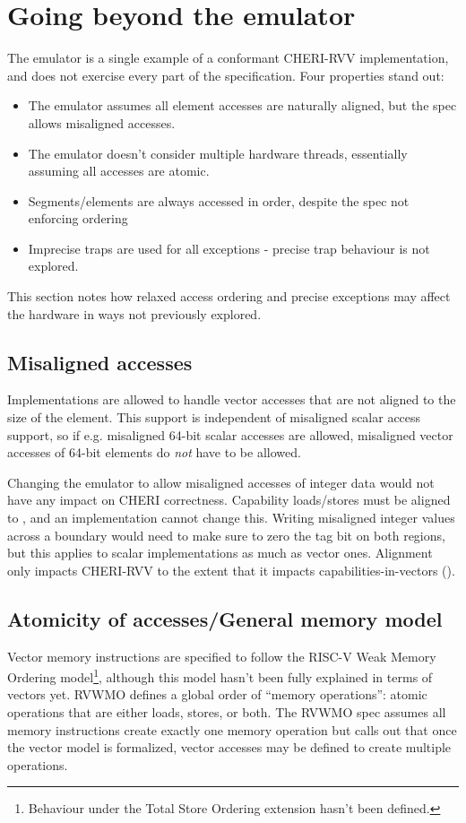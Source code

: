 \section{Going beyond the emulator}
The emulator is a single example of a conformant CHERI-RVV implementation, and does not exercise every part of the specification.
Four properties stand out:
\begin{itemize}
    \item The emulator assumes all element accesses are naturally aligned, but the spec allows misaligned accesses.
    \item The emulator doesn't consider multiple hardware threads, essentially assuming all accesses are atomic.
    \item Segments/elements are always accessed in order, despite the spec not enforcing ordering
    \item Imprecise traps are used for all exceptions - precise trap behaviour is not explored.
\end{itemize}
This section notes how relaxed access ordering and precise exceptions may affect the hardware in ways not previously explored.

\subsection{Misaligned accesses}
Implementations are allowed to handle vector accesses that are not aligned to the size of the element.
This support is independent of misaligned scalar access support, so if e.g. misaligned 64-bit scalar accesses are allowed, misaligned vector accesses of 64-bit elements do \emph{not} have to be allowed.

Changing the emulator to allow misaligned accesses of integer data would not have any impact on CHERI correctness.
Capability loads/stores must be aligned to , and an implementation cannot change this.
Writing misaligned integer values across a  boundary would need to make sure to zero the tag bit on both regions, but this applies to scalar implementations as much as vector ones.
Alignment only impacts CHERI-RVV to the extent that it impacts capabilities-in-vectors ().

\subsection{Atomicity of accesses/General memory model}
Vector memory instructions are specified to follow the RISC-V Weak Memory Ordering model\footnote{Behaviour under the Total Store Ordering extension hasn't been defined.}, although this model hasn't been fully explained in terms of vectors yet.
RVWMO defines a global order of \enquote{memory operations}: atomic operations that are either loads, stores, or both.
The RVWMO spec assumes all memory instructions create exactly one memory operation but calls out that once the vector model is formalized, vector accesses may be defined to create multiple operations.

